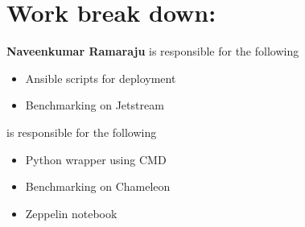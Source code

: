 \documentclass[9pt,twocolumn,twoside]{../../styles/osajnl}
\begin{document}
	\endgroup
	
	\section{Work break down:}
	
	{\bfseries Naveenkumar Ramaraju} is responsible for the following 
	\begin{itemize}
		\item Ansible scripts for deployment
		\item Benchmarking on Jetstream
	\end{itemize}
	
	\hspace{-3ex}{\bfseries Veera Marni} is responsible for the 
	following
	\begin{itemize}
		\item Python wrapper using CMD
		\item Benchmarking on Chameleon
		\item Zeppelin notebook
	\end{itemize}
	
	
	
		
	
	\newpage
	
\end{document}

